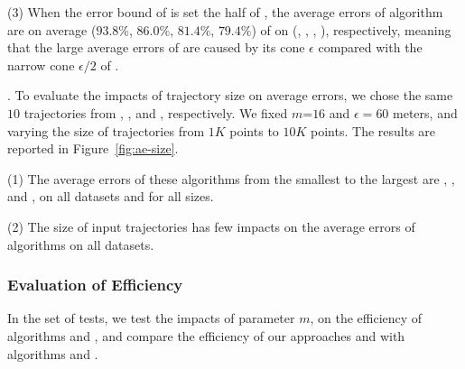 \ni(3) When the error bound of \cista is set the half of \cist, the average errors of algorithm \cista are on average ($93.8\%$, $86.0\%$, $81.4\%$, {$79.4\%$}) of \cist on (\truck, \sercar, \geolife, \pricar), respectively, meaning that the large average errors of \cista are caused by its cone \wrt $\epsilon$ compared with the narrow cone \wrt $\epsilon/2$ of \cist.


.
To evaluate the impacts of trajectory size on average errors, we chose the same {$10$} trajectories from \truck, \sercar, \geolife and \pricar, respectively.
We fixed {$m$=$16$} and $\epsilon = 60$ meters, and varying the size  of trajectories from $1K$ points to $10K$ points.
%
The results are reported in Figure~\ref{fig:ae-size}.

\ni(1) The average errors of these algorithms from the smallest to the largest are \squishe, \dps, \cist and \cista, on all datasets and for all sizes. %

\ni(2) The size of input trajectories has few impacts on the average errors of \lsa algorithms on all datasets.




\subsubsection{Evaluation of Efficiency}


In the set of tests, we test the impacts of parameter $m$, on the efficiency of algorithms \cist and \cista, and compare the efficiency of our approaches \cist and \cista with algorithms \dps and \squishe.
%





